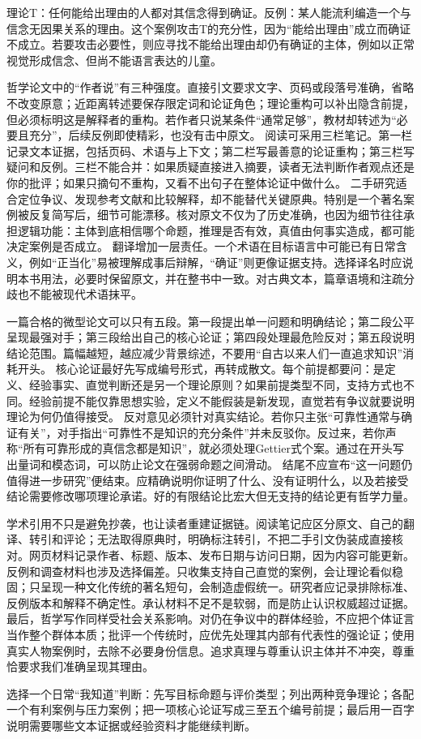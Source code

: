 \begin{argumentbox}[条件分析示范]
理论T：任何能给出理由的人都对其信念得到确证。反例：某人能流利编造一个与信念无因果关系的理由。这个案例攻击T的充分性，因为“能给出理由”成立而确证不成立。若要攻击必要性，则应寻找不能给出理由却仍有确证的主体，例如以正常视觉形成信念、但尚不能语言表达的儿童。
\end{argumentbox}

哲学论文中的“作者说”有三种强度。直接引文要求文字、页码或段落号准确，省略不改变原意；近距离转述要保存限定词和论证角色；理论重构可以补出隐含前提，但必须标明这是解释者的重构。若作者只说某条件“通常足够”，教材却转述为“必要且充分”，后续反例即使精彩，也没有击中原文。 阅读可采用三栏笔记。第一栏记录文本证据，包括页码、术语与上下文；第二栏写最善意的论证重构；第三栏写疑问和反例。三栏不能合并：如果质疑直接进入摘要，读者无法判断作者观点还是你的批评；如果只摘句不重构，又看不出句子在整体论证中做什么。 二手研究适合定位争议、发现参考文献和比较解释，却不能替代关键原典。特别是一个著名案例被反复简写后，细节可能漂移。核对原文不仅为了历史准确，也因为细节往往承担逻辑功能：主体到底相信哪个命题，推理是否有效，真值由何事实造成，都可能决定案例是否成立。 翻译增加一层责任。一个术语在目标语言中可能已有日常含义，例如“正当化”易被理解成事后辩解，“确证”则更像证据支持。选择译名时应说明本书用法，必要时保留原文，并在整书中一致。对古典文本，篇章语境和注疏分歧也不能被现代术语抹平。

一篇合格的微型论文可以只有五段。第一段提出单一问题和明确结论；第二段公平呈现最强对手；第三段给出自己的核心论证；第四段处理最危险反对；第五段说明结论范围。篇幅越短，越应减少背景综述，不要用“自古以来人们一直追求知识”消耗开头。 核心论证最好先写成编号形式，再转成散文。每个前提都要问：是定义、经验事实、直觉判断还是另一个理论原则？如果前提类型不同，支持方式也不同。经验前提不能仅靠思想实验，定义不能假装是新发现，直觉若有争议就要说明理论为何仍值得接受。 反对意见必须针对真实结论。若你只主张“可靠性通常与确证有关”，对手指出“可靠性不是知识的充分条件”并未反驳你。反过来，若你声称“所有可靠形成的真信念都是知识”，就必须处理Gettier式个案。通过在开头写出量词和模态词，可以防止论文在强弱命题之间滑动。 结尾不应宣布“这一问题仍值得进一步研究”便结束。应精确说明你证明了什么、没有证明什么，以及若接受结论需要修改哪项理论承诺。好的有限结论比宏大但无支持的结论更有哲学力量。

学术引用不只是避免抄袭，也让读者重建证据链。阅读笔记应区分原文、自己的翻译、转引和评论；无法取得原典时，明确标注转引，不把二手引文伪装成直接核对。网页材料记录作者、标题、版本、发布日期与访问日期，因为内容可能更新。 反例和调查材料也涉及选择偏差。只收集支持自己直觉的案例，会让理论看似稳固；只呈现一种文化传统的著名短句，会制造虚假统一。研究者应记录排除标准、反例版本和解释不确定性。承认材料不足不是软弱，而是防止认识权威超过证据。 最后，哲学写作同样受社会关系影响。对仍在争议中的群体经验，不应把个体证言当作整个群体本质；批评一个传统时，应优先处理其内部有代表性的强论证；使用真实人物案例时，去除不必要身份信息。追求真理与尊重认识主体并不冲突，尊重恰要求我们准确呈现其理由。

\begin{tcolorbox}[breakable,colback=white,colframe=blue!30!black,title={本章研读任务},fonttitle=\bfseries]
选择一个日常“我知道”判断：先写目标命题与评价类型；列出两种竞争理论；各配一个有利案例与压力案例；把一项核心论证写成三至五个编号前提；最后用一百字说明需要哪些文本证据或经验资料才能继续判断。
\end{tcolorbox}
